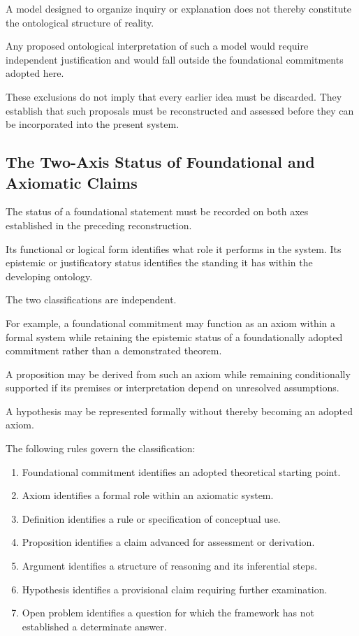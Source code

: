 A model designed to organize inquiry
or explanation does not thereby
constitute the ontological structure
of reality.

Any proposed ontological interpretation
of such a model would require
independent justification and
would fall outside the foundational
commitments adopted here.

These exclusions do not imply that
every earlier idea must be discarded.
They establish that such proposals
must be reconstructed and assessed
before they can be incorporated
into the present system.

\subsection{The Two-Axis Status of Foundational and Axiomatic Claims}

The status of a foundational statement
must be recorded on both axes established
in the preceding reconstruction.

Its functional or logical form identifies
what role it performs in the system.
Its epistemic or justificatory status
identifies the standing it has within
the developing ontology.

The two classifications are independent.

For example, a foundational commitment
may function as an axiom within a
formal system while retaining the
epistemic status of a foundationally
adopted commitment rather than a
demonstrated theorem.

A proposition may be derived from
such an axiom while remaining
conditionally supported if its
premises or interpretation depend
on unresolved assumptions.

A hypothesis may be represented
formally without thereby becoming
an adopted axiom.

The following rules govern the
classification:

\begin{enumerate}
    \item Foundational commitment identifies
    an adopted theoretical starting point.

    \item Axiom identifies a formal role
    within an axiomatic system.

    \item Definition identifies a rule
    or specification of conceptual use.

    \item Proposition identifies a claim
    advanced for assessment or derivation.

    \item Argument identifies a structure
    of reasoning and its inferential steps.

    \item Hypothesis identifies a provisional
    claim requiring further examination.

    \item Open problem identifies a question
    for which the framework has not
    established a determinate answer.
\end{enumerate}

